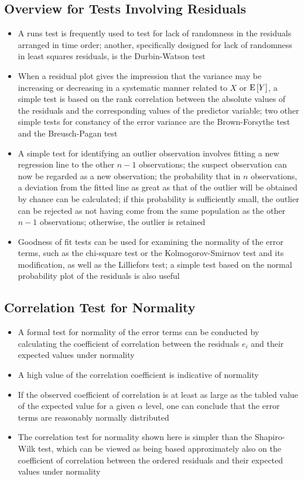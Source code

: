\subsection{Overview for Tests Involving Residuals}
\begin{itemize} 
\item A runs test is frequently used to test for lack of randomness in the residuals arranged in time order; another, specifically designed for lack of randomness in least squares residuals, is the Durbin-Watson test 
\item When a residual plot gives the impression that the variance may be increasing or decreasing in a systematic manner related to $X$ or $\mathrm{E}\left[ Y \right]$, a simple test is based on the rank correlation between the absolute values of the residuals and the corresponding values of the predictor variable; two other simple tests for constancy of the error variance are the Brown-Forsythe test and the Breusch-Pagan test
\item A simple test for identifying an outlier observation involves fitting a new regression line to the other $n-1$ observations; the suspect observation can now be regarded as a new observation; the probability that in $n$ observations, a deviation from the fitted line as great as that of the outlier will be obtained by chance can be calculated; if this probability is sufficiently small, the outlier can be rejected as not having come from the same population as the other $n-1$ observations; otherwise, the outlier is retained 
\item Goodness of fit tests can be used for examining the normality of the error terms, such as the chi-square test or the Kolmogorov-Smirnov test and its modification, as well as the Lilliefors test; a simple test based on the normal probability plot of the residuals is also useful 
\end{itemize} 

\subsection{Correlation Test for Normality}
\begin{itemize}
\item A formal test for normality of the error terms can be conducted by calculating the coefficient of correlation between the residuals $e_i$ and their expected values under normality 
\item A high value of the correlation coefficient is indicative of normality 
\item If the observed coefficient of correlation is at least as large as the tabled value of the expected value for a given $\alpha$ level, one can conclude that the error terms are reasonably normally distributed 
\item The correlation test for normality shown here is simpler than the Shapiro-Wilk test, which can be viewed as being based approximately also on the coefficient of correlation between the ordered residuals and their expected values under normality 
\end{itemize} 

